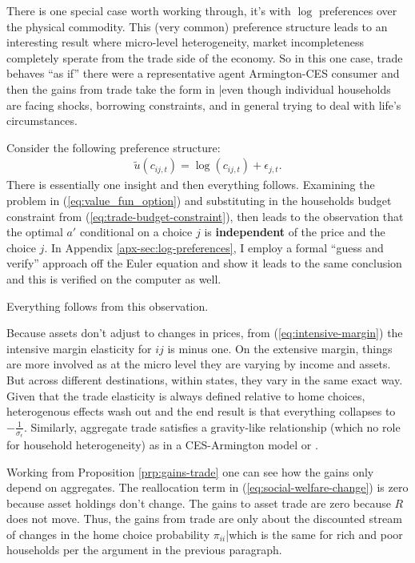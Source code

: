 \documentclass[12pt,pdftex]{article}
\begin{document}
\begin{onehalfspacing}
There is one special case worth working through, it's with $\log$ preferences over the physical commodity. This (very common) preference structure leads to an interesting result where micro-level heterogeneity, market incompleteness completely sperate from the trade side of the economy. So in this one case, trade behaves ``as if'' there were a representative agent Armington-CES consumer and then the gains from trade take the form in \citet{arkolakis2012new}|even though individual households are facing shocks, borrowing constraints, and in general trying to deal with life's circumstances.

Consider the following preference structure:
\begin{align}
\tilde{u}( c_{ij,t} ) =  \log(c_{ij,t}) + \epsilon_{j,t}. \nonumber
\end{align}
There is essentially one insight and then everything follows. Examining the problem in (\ref{eq:value_fun_option}) and substituting in the households budget constraint from (\ref{eq:trade-budget-constraint}), then leads to the observation that the optimal $a'$ conditional on a choice $j$ is \textbf{independent} of the price and the choice $j$. In Appendix \ref{apx-sec:log-preferences}, I employ a formal ``guess and verify'' approach off the Euler equation and show it leads to the same conclusion and this is verified on the computer as well.

Everything follows from this observation.

Because assets don't adjust to changes in prices, from (\ref{eq:intensive-margin}) the intensive margin elasticity for $ij$ is minus one. On the extensive margin, things are more involved as at the micro level they are varying by income and assets. But across different destinations, within states, they vary in the same exact way. Given that the trade elasticity is always defined relative to home choices, heterogenous effects wash out and the end result is that everything collapses to $-\frac{1}{\sigma_{\epsilon}}$. Similarly, aggregate trade satisfies a gravity-like relationship (which no role for household heterogeneity) as in a CES-Armington model or \citet{eaton2002technology}.

Working from Proposition \ref{prp:gains-trade} one can see how the gains only depend on aggregates. The reallocation term in (\ref{eq:social-welfare-change}) is zero because asset holdings don't change. The gains to asset trade are zero because $R$ does not move. Thus, the gains from trade are only about the discounted stream of changes in the home choice probability $\pi_{ii}$|which is the same for rich and poor households per the argument in the previous paragraph.


\end{onehalfspacing}
\end{document}
